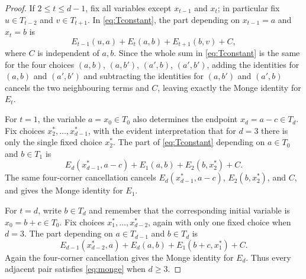\documentclass[10pt,a4paper]{amsart}
\begin{document}
\begin{proof}
If $2\le t\le d-1$, fix all variables except $x_{t-1}$ and $x_t$; in particular fix $u\in T_{t-2}$ and $v\in T_{t+1}$.  In \eqref{eq:Tconstant}, the part depending on $x_{t-1}=a$ and $x_t=b$ is
\[
        E_{t-1}(u,a)+E_t(a,b)+E_{t+1}(b,v)+C,
\]
where $C$ is independent of $a,b$.  Since the whole sum in \eqref{eq:Tconstant} is the same for the four choices $(a,b)$, $(a,b')$, $(a',b)$, $(a',b')$, adding the identities for $(a,b)$ and $(a',b')$ and subtracting the identities for $(a,b')$ and $(a',b)$ cancels the two neighbouring terms and $C$, leaving exactly the Monge identity for $E_t$.

For $t=1$, the variable $a=x_0\in T_0$ also determines the endpoint $x_d=a-c\in T_d$.  Fix choices $x_2^*,\ldots,x_{d-1}^*$, with the evident interpretation that for $d=3$ there is only the single fixed choice $x_2^*$.  The part of \eqref{eq:Tconstant} depending on $a\in T_0$ and $b\in T_1$ is
\[
        E_d(x_{d-1}^*,a-c)+E_1(a,b)+E_2(b,x_2^*)+C .
\]
The same four-corner cancellation cancels $E_d(x_{d-1}^*,a-c)$, $E_2(b,x_2^*)$, and $C$, and gives the Monge identity for $E_1$.

For $t=d$, write $b\in T_d$ and remember that the corresponding initial variable is $x_0=b+c\in T_0$.  Fix choices $x_1^*,\ldots,x_{d-2}^*$, again with only one fixed choice when $d=3$.  The part depending on $a\in T_{d-1}$ and $b\in T_d$ is
\[
        E_{d-1}(x_{d-2}^*,a)+E_d(a,b)+E_1(b+c,x_1^*)+C .
\]
Again the four-corner cancellation gives the Monge identity for $E_d$.  Thus every adjacent pair satisfies \eqref{eq:monge} when $d\ge3$.


\end{proof}
\end{document}
